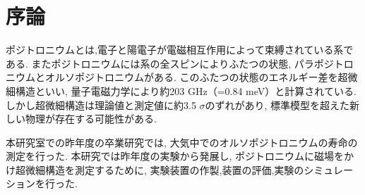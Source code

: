 \chapter{序論}\label{introduction}

ポジトロニウムとは,電子と陽電子が電磁相互作用によって束縛されている系である.
またポジトロニウムには系の全スピンによりふたつの状態,
パラポジトロニウムとオルソポジトロニウムがある.
このふたつの状態のエネルギー差を超微細構造といい,
量子電磁力学により約203 GHz（=0.84 meV）と計算されている.
しかし超微細構造は理論値と測定値に約3.5 $\sigma$のずれがあり,
標準模型を超えた新しい物理が存在する可能性がある.

本研究室での昨年度の卒業研究では,
大気中でのオルソポジトロニウムの寿命の測定を行った.
本研究では昨年度の実験から発展し,
ポジトロニウムに磁場をかけ超微細構造を測定するために,
実験装置の作製,装置の評価,実験のシミュレーションを行った.

